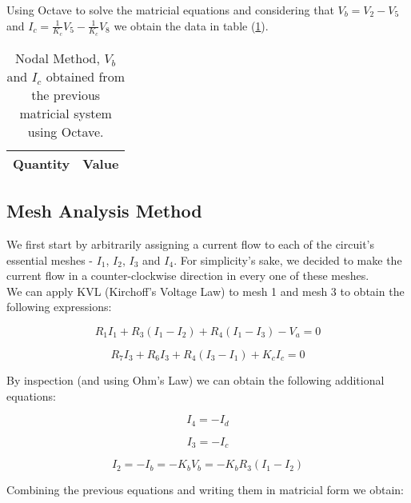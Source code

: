Using Octave to solve the matricial equations and considering that $V_b = V_2 - V_5$ 
and $I_c = \frac{1}{K_c} V_5 - \frac{1}{K_c} V_8$ we obtain the data in table (\ref{tab:NodalMethod}).

\begin{table}[H]
  \centering
  \begin{tabular}{|l|r|}
    \hline    
    {\bf Quantity} & {\bf Value} \\ \hline
    
  \end{tabular}
  \caption{Nodal Method, $V_b$ and $I_c$ obtained from the previous matricial system using Octave.}
  \label{tab:NodalMethod}
\end{table}


\subsection{Mesh Analysis Method}

We first start by arbitrarily assigning a current flow to each of the circuit's essential meshes - $I_1$, $I_2$, $I_3$ and $I_4$.
For simplicity's sake, we decided to make the current flow in a counter-clockwise direction in every one of these meshes.
\\
We can apply KVL (Kirchoff's Voltage Law) to mesh 1 and mesh 3 to obtain the following expressions:

\begin{equation}
    R_1 I_1 + R_3 (I_1 - I_2) + R_4 (I_1 - I_3) - V_a = 0
\end{equation}

\begin{equation}
    R_7 I_3 + R_6 I_3 + R_4(I_3-I_1) + K_c I_c = 0
\end{equation}

By inspection (and using Ohm's Law) we can obtain the following additional equations:

\begin{equation}
    I_4 = - I_d
\end{equation}

\begin{equation}
    I_3 = - I_c
\end{equation}

\begin{equation}
    I_2 = - I_b = - K_b V_b = - K_b R_3 (I_1 - I_2)
\end{equation}

Combining the previous equations and writing them in matricial form we obtain:

